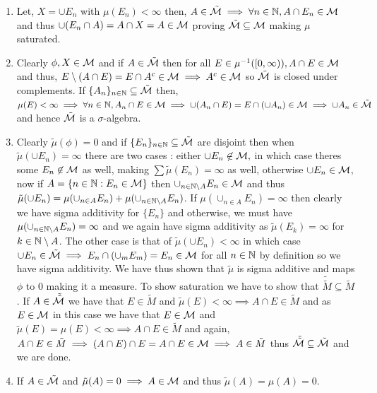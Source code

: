 \documentclass[12pt,a4paper]{article}
\begin{document}
\begin{solution}
    \begin{enumerate}[label=\alph*.]
        \item Let, $X=\cup E_n$ with $\mu(E_n)<\infty$ then, $A\in\tilde{\mathcal{M}}\implies\forall n\in\mathbb{N},A\cap E_n\in\mathcal{M}$ and thus $\cup(E_n\cap A)=A\cap X=A\in\mathcal{M}$ proving $\tilde{\mathcal{M}}\subseteq \mathcal{M}$ making $\mu$ saturated.
        \item Clearly $\phi,X\in\mathcal{M}$ and if $A\in\tilde{\mathcal{M}}$ then for all $E\in\mu^{-1}([0,\infty)),A\cap E\in\mathcal{M}$ and thus, $E\setminus (A\cap E)=E\cap A^c\in\mathcal{M}\implies A^c\in\mathcal{M}$ so $\tilde{\mathcal{M}}$ is closed under complements. 
        If $\{A_n\}_{n\in\mathbb{N}}\subseteq\tilde{\mathcal{M}}$ then, $\mu(E)<\infty\implies\forall n\in\mathbb{N},A_n\cap E\in\mathcal{M}\implies\cup(A_n\cap E)=E\cap(\cup A_n)\in\mathcal{M}\implies\cup A_n\in\tilde{\mathcal{M}}$ and hence $\tilde{\mathcal{M}}$ is a $\sigma$-algebra.
        \item Clearly $\tilde{\mu}(\phi)=0$ and if $\{E_n\}_{n\in\mathbb{N}}\subseteq\tilde{\mathcal{M}}$ are disjoint then when $\tilde{\mu}(\cup E_n)=\infty$ there are two cases : either $\cup E_n\not\in\mathcal{M},$ in which case theres some $E_n\not\in\mathcal{M}$ as well, making $\sum\tilde{\mu}(E_n)=\infty$ as well, otherwise $\cup E_n\in\mathcal{M}$, now if $A=\{n\in\mathbb{N}:E_n\in\mathcal{M}\}$ then $\cup_{n\in\mathbb{N}\setminus A}E_n\in\mathcal{M}$ and thus $\tilde{\mu}(\cup E_n)=\mu(\cup_{n\in A}E_n)+\mu(\cup_{n\in\mathbb{N}\setminus A}E_n)$. 
        If $\mu(\cup_{n\in A}E_n)=\infty$ then clearly we have sigma additivity for $\{E_n\}$ and otherwise, we must have $\mu(\cup_{n\in\mathbb{N}\setminus A}E_n)=\infty$ and we again have sigma additivity as $\tilde{\mu}(E_k)=\infty$ for $k\in\mathbb{N}\setminus A$.  
        The other case is that of $\tilde{\mu}(\cup E_n)<\infty$ in which case $\cup E_n\in\tilde{\mathcal{M}}\implies E_n\cap(\cup_m E_m)=E_n\in\mathcal{M}$ for all $n\in\mathbb{N}$ by definition so we have sigma additivity.
        We have thus shown that $\tilde{\mu}$ is sigma additive and maps $\phi$ to $0$ making it a measure.
        To show saturation we have to show that $\tilde{\tilde{M}}\subseteq\tilde{M}$.
        If $A\in\tilde{\tilde{\mathcal{M}}}$ we have that $E\in\tilde{M}$ and $\tilde{\mu}(E)<\infty\implies A\cap E\in\tilde{M}$ and as $E\in\mathcal{M}$ in this case we have that $E\in\mathcal{M}$ and $\tilde{\mu}(E)=\mu(E)<\infty\implies A\cap E\in\tilde{M}$ and again, $A\cap E\in\tilde{M}\implies(A\cap E)\cap E=A\cap E\in\mathcal{M}\implies A\in\tilde{M}$ thus $\tilde{\tilde{\mathcal{M}}}\subseteq\tilde{\mathcal{M}}$ and we are done.
        \item If $A\in\tilde{\mathcal{M}}$ and $\tilde{\mu}(A)=0\implies A\in\mathcal{M}$ and thus $\tilde{\mu}(A)=\mu(A)=0$. 

\end{enumerate}
\end{solution}
\end{document}
